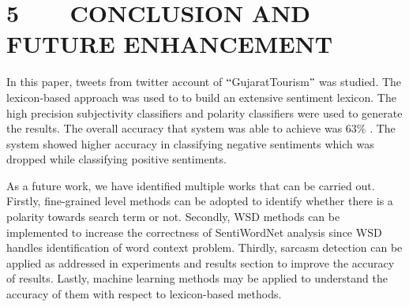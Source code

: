 \documentclass[12pt]{article}
\begin{document}
\section*{5\ \ \ \  CONCLUSION AND FUTURE ENHANCEMENT}
\begin{justify}
\tab In this paper, tweets from twitter account of $``$GujaratTourism$"$  was studied. The lexicon-based approach was used to to build an extensive sentiment lexicon. The high precision subjectivity classifiers and polarity classifiers were used to generate the results. The overall accuracy that system was able to achieve was 63$\%$ . The system showed higher accuracy in classifying negative sentiments which was dropped while classifying positive sentiments. 
\end{justify}\par

\begin{justify}
\tab As a future work, we have identified multiple works that can be carried out. Firstly, fine-grained level methods can be adopted to identify whether there is a polarity towards search term or not. Secondly, WSD methods can be implemented to increase the correctness of SentiWordNet analysis since WSD handles identification of word context problem. Thirdly, sarcasm detection can be applied as addressed in experiments and results section to improve the accuracy of results. Lastly, machine learning methods may be applied to understand the accuracy of them with respect to lexicon-based methods.
\end{justify}\par

\begin{justify}
 
\end{justify}\par
\end{document}
